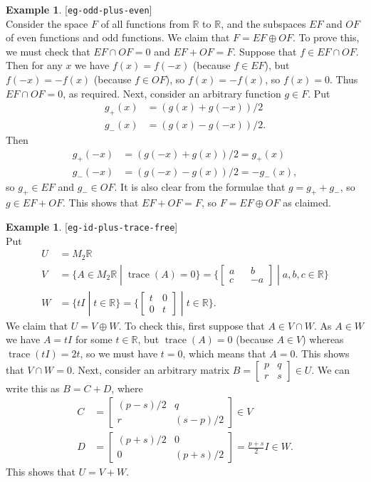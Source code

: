 \documentclass{amsart}
\newcommand{\lbl}[1]{\label{#1}\textup{[\texttt{#1}]}\ \\}
\newcommand{\lbl}{\label}
\newcommand{\R}         {{\mathbb{R}}}
\newcommand{\trc}       {\operatorname{trace}}
\newcommand{\bsm}       {\left[\begin{smallmatrix}}
\newcommand{\esm}       {\end{smallmatrix}\right]}
\newcommand{\st}        {\;|\;}
\newcommand{\op}        {\oplus}
\renewcommand{\:}       {\colon}
\theoremstyle{definition}
\newtheorem{example}[theorem]{Example}
\begin{document}
\begin{example}\lbl{eg-odd-plus-even}
 Consider the space $F$ of all functions from $\R$ to $\R$,
 and the subspaces $EF$ and $OF$ of even functions and odd
 functions.  We claim that $F=EF\op OF$.  To prove this, we
 must check that $EF\cap OF=0$ and $EF+OF=F$.  Suppose that
 $f\in EF\cap OF$.  Then for any $x$ we have $f(x)=f(-x)$
 (because $f\in EF$), but $f(-x)=-f(x)$ (because $f\in OF$),
 so $f(x)=-f(x)$, so $f(x)=0$.  Thus $EF\cap OF=0$, as
 required.  Next, consider an arbitrary function $g\in F$.
 Put 
 \begin{align*}
  g_+(x) &= (g(x) + g(-x))/2 \\
  g_-(x) &= (g(x) - g(-x))/2.
 \end{align*}
 Then 
 \begin{align*}
  g_+(-x) &= (g(-x)+g(x))/2 = g_+(x) \\
  g_-(-x) &= (g(-x) - g(x))/2 = -g_-(x),
 \end{align*}
 so $g_+\in EF$ and $g_-\in OF$.  It is also clear from the
 formulae that $g=g_++g_-$, so $g\in EF+OF$.  This shows
 that $EF+OF=F$, so $F=EF\op OF$ as claimed.
\end{example}
\begin{example}\lbl{eg-id-plus-trace-free}
 Put 
 \begin{align*}
  U &= M_2\R \\
  V &= \{A\in M_2\R\st \trc(A)=0\}
     = \{\bsm a && b \\ c && -a \esm \st a,b,c\in\R\} \\
  W &= \{tI\st t\in\R\} 
     = \{\bsm t & 0 \\ 0 & t \esm \st t\in \R\}.
 \end{align*}
 We claim that $U=V\op W$.  To check this, first suppose
 that $A\in V\cap W$.  As $A\in W$ we have $A=tI$ for some
 $t\in\R$, but $\trc(A)=0$ (because $A\in V$) whereas
 $\trc(tI)=2t$, so we must have $t=0$, which means that
 $A=0$.  This shows that $V\cap W=0$.  Next, consider an
 arbitrary matrix $B=\bsm p&q\\r&s\esm\in U$.  We can write
 this as $B=C+D$, where 
 \begin{align*}
  C &= \bsm (p-s)/2 & q \\ r & (s-p)/2 \esm \in V \\
  D &= \bsm (p+s)/2 & 0 \\ 0 & (p+s)/2 \esm
     = \frac{p+s}{2} I \in W.
 \end{align*}
 This shows that $U=V+W$.
\end{example}
\end{document}

